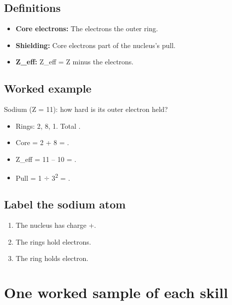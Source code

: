 \documentclass[11pt]{article}
\begin{document}
\subsection*{Definitions}\begin{itemize}
\item \textbf{Core electrons:} The electrons  the outer ring.
\item \textbf{Shielding:} Core electrons  part of the nucleus's pull.
\item \textbf{Z\_eff:} Z\_eff = Z minus the  electrons.
\end{itemize}
\subsection*{Worked example}
Sodium (Z = 11): how hard is its outer electron held?\\
\begin{itemize}
\item Rings: 2, 8, 1. Total .
\item Core = 2 + 8 = .
\item Z\_eff = 11 -- 10 = .
\item Pull = 1 $\div$ 3\textsuperscript{2} = .
\end{itemize}
\subsection*{Label the sodium atom}
\begin{enumerate}
\item The nucleus has charge +.
\item The  rings hold  electrons.
\item The  ring holds  electron.
\end{enumerate}
\section*{One worked sample of each skill}
\end{document}
